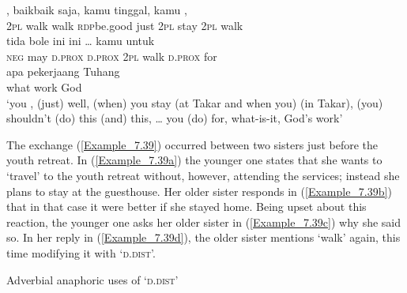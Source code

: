 {\ea
\label{Example_7.38}
 {{,}} {{}} {{baik{\Tilde}baik}} {saja,} {{kamu}} {{tinggal,}} {{kamu}} {,}\\ %
 {\textsc{2pl}}  {walk}  {walk}  {\textsc{rdp}{\Tilde}be.good}  just  {\textsc{2pl}}  {stay}  {\textsc{2pl}}  walk\\
\gll tida  {bole}  {ini}  ini  {\ldots}  {kamu}  {}  {}  {untuk}\\
 \textsc{neg}  {may}  {\textsc{d.prox}}  \textsc{d.prox}  { }   {\textsc{2pl}}  {walk}  {\textsc{d.prox}}  {for}\\
\gll apa  {pekerjaang}  {Tuhang}\\
 what  {work}  {God}\\
\glt 
‘you , (just)  well, (when) you stay (at Takar and when you)  (in Takar), (you) shouldn’t (do) this (and) this, {\ldots} you (do)  for, what-is-it, God’s work’ \textstyleExampleSource{[081025-008-Cv.0142/0144]}
\z



The exchange (\ref{Example_7.39}) occurred between two sisters just before the youth retreat. In (\ref{Example_7.39a}) the younger one states that she wants to  ‘travel’ to the youth retreat without, however, attending the services; instead she plans to stay at the guesthouse. Her older sister responds in (\ref{Example_7.39b}) that in that case it were better if she stayed home. Being upset about this reaction, the younger one asks her older sister in (\ref{Example_7.39c}) why she said so. In her reply in (\ref{Example_7.39d}), the older sister mentions  ‘walk’ again, this time modifying it with  ‘\textsc{d.dist}’.


\begin{styleExampleTitle}
Adverbial anaphoric uses of  ‘\textsc{d.dist}’
\end{styleExampleTitle}

}
